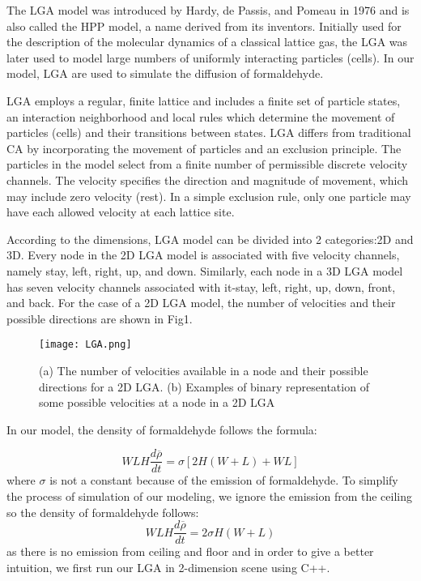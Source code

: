 \documentclass{mcmthesis}
\begin{document}
The LGA model was introduced by Hardy, de Passis, and Pomeau in 1976 \cite{PhysRevLett.56.1505} and is also called the HPP model, a name derived from its inventors. Initially used for the description of the molecular dynamics of a classical lattice gas, the LGA was later used to model large numbers of uniformly interacting particles (cells). In our model, LGA are used to simulate the diffusion of formaldehyde.

LGA employs a regular, finite lattice and includes a finite set of particle states, an interaction neighborhood and local rules which determine the movement of particles (cells) and their transitions between states.\cite{weimar1997simulation} LGA differs from traditional CA by incorporating the movement of particles and an exclusion principle. The particles in the model select from a finite number of permissible discrete velocity channels. The velocity specifies the direction and magnitude of movement, which may include zero velocity (rest). In a simple exclusion rule, only one particle may have each allowed velocity at each lattice site.

According to the dimensions, LGA model can be divided into 2 categories:2D and 3D\cite{3D_model}. Every node in the 2D LGA model is associated with five velocity channels, namely stay, left, right, up, and down. Similarly, each node in a 3D LGA model has seven velocity channels associated with it-stay, left, right, up, down, front, and back. For the case of a 2D LGA model, the number of velocities and their possible directions are shown in Fig1.

\begin{figure}[H]
  \texttt{[image: LGA.png]}
  \caption{(a) The number of velocities available in a node and their possible directions for a 2D LGA. (b) Examples of binary representation of some possible velocities at a node in a 2D LGA}
  \label{fig:LGA_state}
\end{figure}

In our model, the density of formaldehyde follows the formula:

\begin{equation}
 WLH\frac{{d\overline \rho  }}{{dt}} = \sigma [2H(W + L) + WL]
\end{equation}
where $\sigma$ is not a constant because of the emission of formaldehyde. To simplify the process of simulation of our modeling, we ignore the emission from the ceiling so the density of formaldehyde follows:
\begin{equation}
 WLH\frac{{d\overline \rho  }}{{dt}} =2\sigma H(W+L)
\end{equation}
as there is no emission from ceiling and floor and in order to give a better intuition, we first run our LGA in 2-dimension scene using C++.
\end{document}
